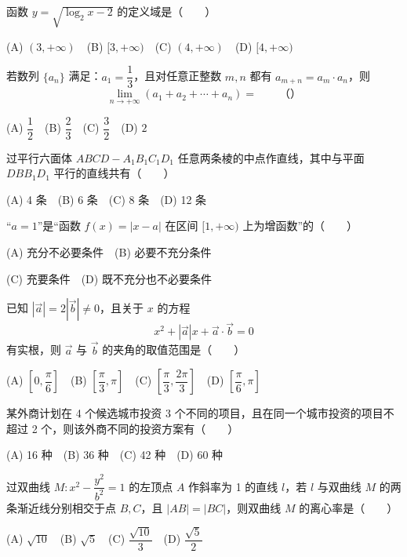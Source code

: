 \begin{question}
函数 $y=\sqrt{\log_2 x-2}$ 的定义域是\mbox{（　　）}

(A) $(3,+\infty)$　(B) $[3,+\infty)$　(C) $(4,+\infty)$　(D) $[4,+\infty)$

\end{question}
\begin{question}
若数列 $\{a_n\}$ 满足：$a_1=\dfrac13$，且对任意正整数 $m,n$ 都有 $a_{m+n}=a_m\cdot a_n$，则
\nopagebreak[4]
\[
\lim_{n\to+\infty}(a_1+a_2+\cdots+a_n)=\qquad（　　）
\]

(A) $\dfrac12$　(B) $\dfrac23$　(C) $\dfrac32$　(D) $2$

\end{question}
\begin{question}
过平行六面体 $ABCD-A_1B_1C_1D_1$ 任意两条棱的中点作直线，其中与平面 $DBB_1D_1$ 平行的直线共有\mbox{（　　）}

(A) 4 条　(B) 6 条　(C) 8 条　(D) 12 条

\end{question}
\begin{question}
“$a=1$”是“函数 $f(x)=|x-a|$ 在区间 $[1,+\infty)$ 上为增函数”的\mbox{（　　）}

(A) 充分不必要条件　(B) 必要不充分条件

(C) 充要条件　(D) 既不充分也不必要条件

\end{question}
\begin{question}
已知 $|\vec a|=2|\vec b|\ne0$，且关于 $x$ 的方程
\nopagebreak[4]
\[
x^2+|\vec a|x+\vec a\cdot\vec b=0
\]
有实根，则 $\vec a$ 与 $\vec b$ 的夹角的取值范围是\mbox{（　　）}

(A) $\left[0,\dfrac\pi6\right]$　(B) $\left[\dfrac\pi3,\pi\right]$　(C) $\left[\dfrac\pi3,\dfrac{2\pi}3\right]$　(D) $\left[\dfrac\pi6,\pi\right]$

\end{question}
\begin{question}
某外商计划在 4 个候选城市投资 3 个不同的项目，且在同一个城市投资的项目不超过 2 个，则该外商不同的投资方案有\mbox{（　　）}

(A) 16 种　(B) 36 种　(C) 42 种　(D) 60 种

\end{question}
\begin{question}
过双曲线 $M:x^2-\dfrac{y^2}{b^2}=1$ 的左顶点 $A$ 作斜率为 1 的直线 $l$，若 $l$ 与双曲线 $M$ 的两条渐近线分别相交于点 $B,C$，且 $|AB|=|BC|$，则双曲线 $M$ 的离心率是\mbox{（　　）}

(A) $\sqrt{10}$　(B) $\sqrt5$　(C) $\dfrac{\sqrt{10}}3$　(D) $\dfrac{\sqrt5}2$

\end{question}
